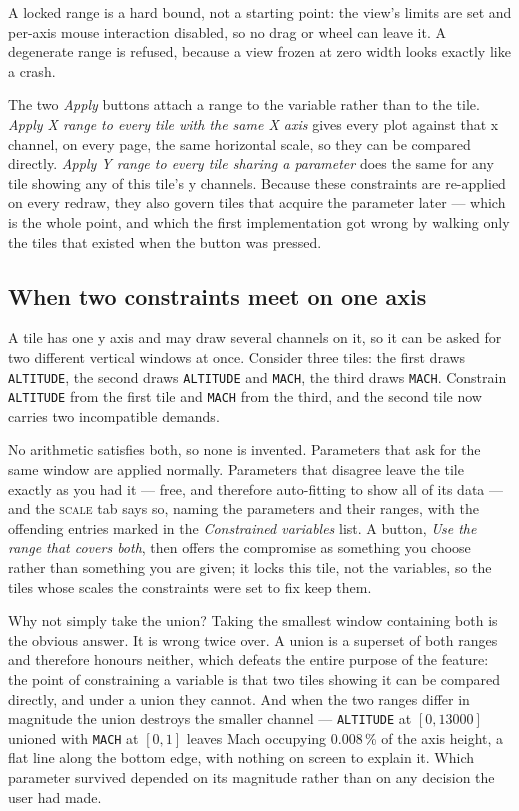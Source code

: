 \documentclass[11pt,a4paper,oneside]{report}
\newcommand{\code}[1]{\texttt{#1}}
\newcommand{\tab}[1]{\textsc{#1}}
\begin{document}
A locked range is a hard bound, not a starting point: the view's limits are set
and per-axis mouse interaction disabled, so no drag or wheel can leave it. A
degenerate range is refused, because a view frozen at zero width looks exactly
like a crash.

The two \emph{Apply} buttons attach a range to the variable rather than to the
tile. \emph{Apply X range to every tile with the same X axis} gives every plot
against that x channel, on every page, the same horizontal scale, so they can be
compared directly. \emph{Apply Y range to every tile sharing a parameter} does
the same for any tile showing any of this tile's y channels. Because these
constraints are re-applied on every redraw, they also govern tiles that acquire
the parameter later --- which is the whole point, and which the first
implementation got wrong by walking only the tiles that existed when the button
was pressed.

\subsection{When two constraints meet on one axis}

A tile has one y axis and may draw several channels on it, so it can be asked for
two different vertical windows at once. Consider three tiles: the first draws
\code{ALTITUDE}, the second draws \code{ALTITUDE} and \code{MACH}, the third
draws \code{MACH}. Constrain \code{ALTITUDE} from the first tile and \code{MACH}
from the third, and the second tile now carries two incompatible demands.

No arithmetic satisfies both, so none is invented. Parameters that ask for the
same window are applied normally. Parameters that disagree leave the tile exactly
as you had it --- free, and therefore auto-fitting to show all of its data ---
and the \tab{scale} tab says so, naming the parameters and their ranges, with the
offending entries marked in the \emph{Constrained variables} list. A button,
\emph{Use the range that covers both}, then offers the compromise as something
you choose rather than something you are given; it locks this tile, not the
variables, so the tiles whose scales the constraints were set to fix keep them.

\begin{aoenote}{Why not simply take the union?}
Taking the smallest window containing both is the obvious answer. It is wrong
twice over. A union is a superset of both
ranges and therefore honours neither, which defeats the entire purpose of the
feature: the point of constraining a variable is that two tiles showing it can be
compared directly, and under a union they cannot. And when the two ranges differ
in magnitude the union destroys the smaller channel --- \code{ALTITUDE} at
$[0, 13000]$ unioned with \code{MACH} at $[0, 1]$ leaves Mach occupying
0.008\,\% of the axis height, a flat line along the bottom edge, with nothing on
screen to explain it. Which parameter survived depended on its magnitude rather
than on any decision the user had made.
\end{aoenote}
\end{document}
